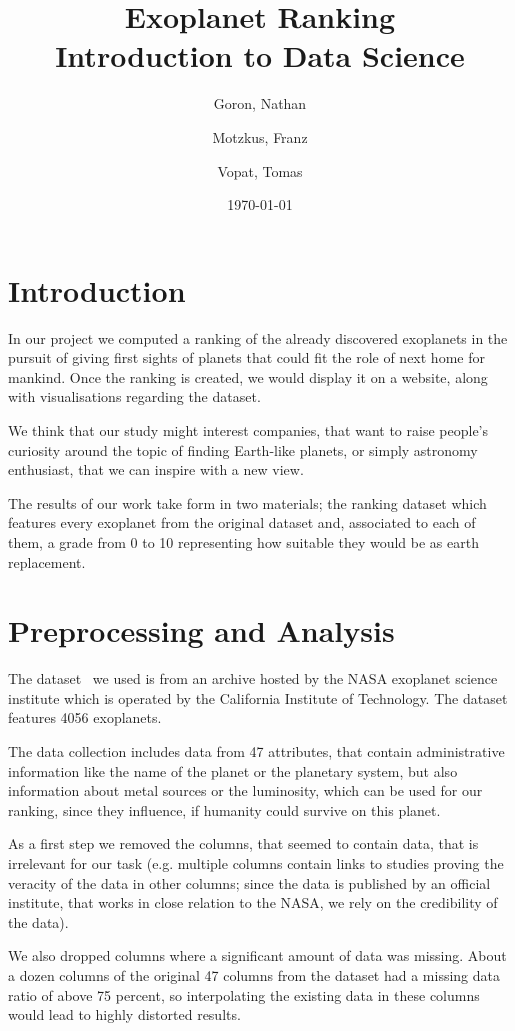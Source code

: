 \documentclass[12p]{article}
\title{Exoplanet Ranking \\\large Introduction to Data Science}
\date{\today}
\author{Goron, Nathan\and Motzkus, Franz\and Vopat, Tomas
}
\begin{document}
\maketitle

\section{Introduction}

In our project we computed a ranking of the already discovered exoplanets in the pursuit of giving first sights of planets that could fit the role of next home for mankind.
Once the ranking is created, we would display it on a website, along with visualisations regarding the dataset.

We think that our study might interest companies, that want to raise people's curiosity around the topic of finding Earth-like planets, or simply astronomy enthusiast, that we can inspire with a new view.

The results of our work take form in two materials; the ranking dataset which features every exoplanet from the original dataset and, associated to each of them, a grade from 0 to 10 representing how suitable they would be as earth replacement.


\section{Preprocessing and Analysis}
The dataset~\cite{dataset} we used is from an archive hosted by the NASA exoplanet science institute which is operated by the California Institute of Technology. The dataset features 4056 exoplanets.

The data collection includes data from 47 attributes, that contain administrative information like the name of the planet or the planetary system, but also information about metal sources or the luminosity, which can be used for our ranking, since they influence, if humanity could survive on this planet.

As a first step we removed the columns, that seemed to contain data, that is irrelevant for our task (e.g. multiple columns contain links to studies proving the veracity of the data in other columns; since the data is published by an official institute, that works in close relation to the NASA, we rely on the credibility of the data). 

We also dropped columns where a significant amount of data was missing. About a dozen columns of the original 47 columns from the dataset had a missing data ratio of above 75 percent, so interpolating the existing data in these columns would lead to highly distorted results.
\end{document}

